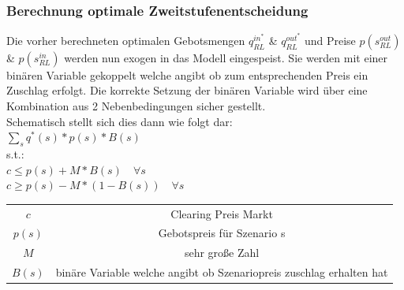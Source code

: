 \subsubsection{Berechnung optimale Zweitstufenentscheidung}
Die vorher berechneten optimalen Gebotsmengen $q^{in^*}_{RL}$ \& $q^{out^*}_{RL}$ und Preise $p(s^{out}_{RL})$ \& $p(s^{in}_{RL})$  werden nun exogen in das Modell eingespeist. Sie werden mit einer binären Variable gekoppelt welche angibt ob zum entsprechenden Preis ein Zuschlag erfolgt. Die korrekte Setzung der binären Variable wird über eine Kombination aus 2 Nebenbedingungen sicher gestellt.\\
Schematisch stellt sich dies dann wie folgt dar:\\
$\sum_s q^*(s) * p(s) * B(s)$\\
s.t.:\\
$c \leq p(s) + M * B(s)\quad\forall s $ \\
$c \geq p(s) - M * (1 - B(s))\quad\forall s $ \\

\begin{tabular}{c|c}
	$c$    & Clearing Preis Markt                                                 \\
	$p(s)$ & Gebotspreis für Szenario s                                           \\
	$M$    & sehr große Zahl                                                      \\
	$B(s)$ & binäre Variable welche angibt ob Szenariopreis zuschlag erhalten hat \\
\end{tabular}\\

